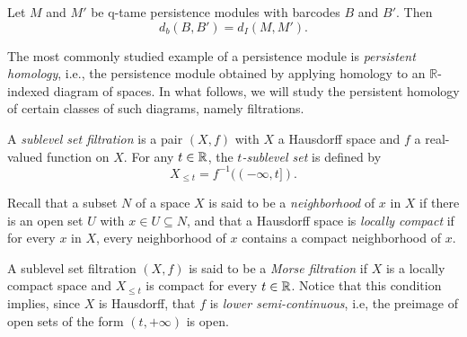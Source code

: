 \begin{thm}[\cite{}]
Let $M$ and $M'$ be q-tame persistence modules with barcodes $B$ and $B'$. Then
\[
d_{b}(B,B')= d_{I}(M,M').
\]
\end{thm}

The most commonly studied example of a persistence module is \emph{persistent homology}, i.e., the persistence module obtained by applying homology to an $\mathbb{R}$-indexed diagram of spaces. In what follows, we will study the persistent homology of certain classes of such diagrams, namely filtrations.

A \textit{sublevel set filtration} is a pair $(X, f)$ with $X$ a Hausdorff space and $f$ a real-valued function on $X$.
For any $t \in \mathbb{R}$, the \textit{$t$-sublevel set} is defined by 
\begin{equation*}
X_{\leq t} = f^{-1}((-\infty, t]).
\end{equation*}

Recall that a subset $N$ of a space $X$ is said to be a \textit{neighborhood} of $x$ in $X$ if there is an open set $U$ with $x \in U \subseteq N$, and that a Hausdorff space is \textit{locally compact} if for every $x$ in $X$, every neighborhood of $x$ contains a compact neighborhood of $x$.

A sublevel set filtration $(X, f)$ is said to be a \textit{Morse filtration} if $X$ is a locally compact space and $X_{\leq t}$ is compact for every $t \in \mathbb{R}$.
Notice that this condition implies, since $X$ is Hausdorff, that $f$ is \textit{lower semi-continuous}, i.e, the preimage of open sets of the form $(t, +\infty)$ is open.
